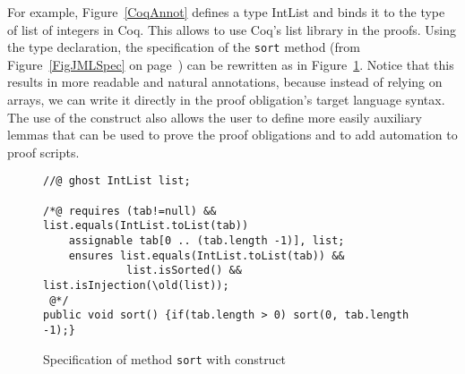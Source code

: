 For example, Figure~\ref{CoqAnnot} defines a \native type IntList and
binds it to the type of list of integers in Coq. This allows to use
Coq's list library in the proofs. Using the \native type declaration,
the specification of the {\tt sort} method (from
Figure~\ref{FigJMLSpec} on page~\pageref{FigJMLSpec}) can be rewritten
as in Figure~\ref{sortnat}. Notice that this results in more readable
and natural annotations, because instead of relying on arrays, we can
write it directly in the proof obligation's target language
syntax. The use of the \native construct also allows the user to
define more easily auxiliary lemmas that can be used to prove the
proof obligations and to add automation to proof scripts.


\begin{figure}[t!]
{\small \begin{verbatim}
//@ ghost IntList list;

/*@ requires (tab!=null) && list.equals(IntList.toList(tab))
    assignable tab[0 .. (tab.length -1)], list;
    ensures list.equals(IntList.toList(tab)) &&
             list.isSorted() && list.isInjection(\old(list));
 @*/
public void sort() {if(tab.length > 0) sort(0, tab.length -1);}\end{verbatim}}
\caption{Specification of method \texttt{sort} with \native construct}
\label{sortnat} 
\end{figure}




